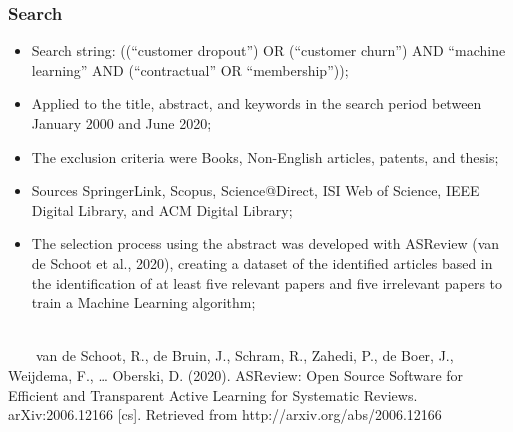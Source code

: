 \documentclass[10pt]{beamer}
\begin{document}
\begin{frame}
	\frametitle{Search }
	\begin{itemize}
		\item Search string: ((“customer dropout”) OR (“customer churn”) AND “machine learning” AND (“contractual” OR “membership”));
		\item Applied to the title, abstract, and keywords in the search period between January 2000 and June 2020;
		\item The exclusion criteria were Books, Non-English articles, patents, and thesis;
		\item Sources SpringerLink, Scopus, Science@Direct, ISI Web of Science, IEEE Digital Library, and ACM Digital Library;
		\item The selection process using the abstract was developed with ASReview (van de Schoot et al., 2020), creating a dataset of the identified articles based in 
		the identification of at least five relevant papers and five irrelevant papers to train a Machine Learning algorithm;
		\\~\\
	\end{itemize}
		\tiny 
		~~~~van de Schoot, R., de Bruin, J., Schram, R., Zahedi, P., de Boer, J., Weijdema, F., … Oberski, D. (2020). ASReview: Open Source Software for Efficient and Transparent Active Learning for Systematic Reviews. arXiv:2006.12166 [cs]. Retrieved from http://arxiv.org/abs/2006.12166 \\
\end{frame}
\end{document}
